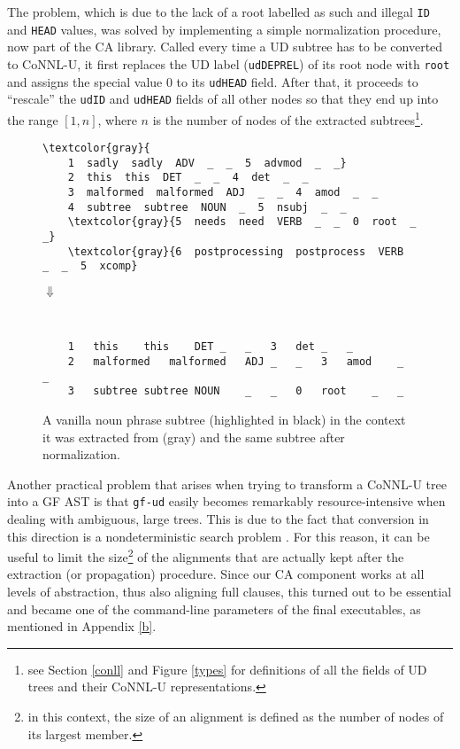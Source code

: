 The problem, which is due to the lack of a root labelled as such and illegal \texttt{ID} and \texttt{HEAD} values, was solved by implementing a simple normalization procedure, now part of the CA library. 
Called every time a UD subtree has to be converted to CoNNL-U, it first replaces the UD label (\texttt{udDEPREL}) of its root node with \texttt{root} and assigns the special value 0 to its \texttt{udHEAD} field. 
After that, it proceeds to ``rescale'' the \texttt{udID} and \texttt{udHEAD} fields of all other nodes so that they end up into the range $[1,n]$, where $n$ is the number of nodes of the extracted subtrees\footnote{see Section \ref{conll} and Figure \ref{types} for definitions of all the fields of UD trees and their CoNNL-U representations.}. \smallskip

\begin{figure}[H]
\small
\begin{Verbatim}[commandchars=\\\{\}]
\textcolor{gray}{   
    1  sadly  sadly  ADV  _  _  5  advmod  _  _}
    2  this  this  DET  _  _  4  det  _  _
    3  malformed  malformed  ADJ  _  _  4  amod  _  _
    4  subtree  subtree  NOUN  _  5  nsubj  _  _
    \textcolor{gray}{5  needs  need  VERB  _  _  0  root  _  _}
    \textcolor{gray}{6  postprocessing  postprocess  VERB  _  _  5  xcomp}

\end{Verbatim}
\centering
\large
$\Downarrow$
\small
\begin{verbatim}


    1	this	this	DET	_	_	3	det	_	_
    2	malformed	malformed	ADJ	_	_	3	amod	_	_
    3	subtree	subtree	NOUN	_	_	0	root	_	_
\end{verbatim}
\caption[A UD subtree and its normalization]{A vanilla noun phrase subtree (highlighted in black) in the context it was extracted from (gray) and the same subtree after normalization.}
\label{normalization}
\end{figure}

Another practical problem that arises when trying to transform a CoNNL-U tree into a GF AST is that \texttt{gf-ud} easily becomes remarkably resource-intensive when dealing with ambiguous, large trees. 
This is due to the fact that conversion in this direction is a nondeterministic search problem \cite{udgf}. 
For this reason, it can be useful to limit the size\footnote{in this context, the size of an alignment is defined as the number of nodes of its largest member.} of the alignments that are actually kept after the extraction (or propagation) procedure. 
Since our CA component works at all levels of abstraction, thus also aligning full clauses, this turned out to be essential and became one of the command-line parameters of the final executables, as mentioned in Appendix \ref{b}. \smallskip

